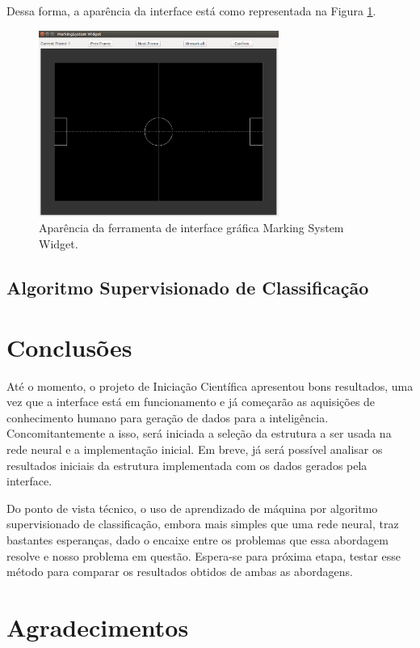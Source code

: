 \documentclass[a4paper,12pt]{article}
\begin{document}
Dessa forma, a aparência da interface está como representada na Figura \ref{fig:ms-widget}.

\begin{figure}[H]
	\centering
	\includegraphics[width=0.7\textwidth]{figures/ms-widget.png}
   \caption{Aparência da ferramenta de interface gráfica Marking System Widget.} \label{fig:ms-widget}
\end{figure}

\subsection{Algoritmo Supervisionado de Classificação}

\section{Conclusões}

Até o momento, o projeto de Iniciação Científica apresentou bons resultados, uma vez que a interface está em funcionamento e já começarão as aquisições de conhecimento humano para geração de dados para a inteligência. Concomitantemente a isso, será iniciada a seleção da estrutura a ser usada na rede neural e a implementação inicial. Em breve, já será possível analisar os resultados iniciais da estrutura implementada com os dados gerados pela interface.

Do ponto de vista técnico, o uso de aprendizado de máquina por algoritmo supervisionado de classificação, embora mais simples que uma rede neural, traz bastantes esperanças, dado o encaixe entre os problemas que essa abordagem resolve e nosso problema em questão. Espera-se para próxima etapa, testar esse método para comparar os resultados obtidos de ambas as abordagens.

\section{Agradecimentos}
\end{document}
